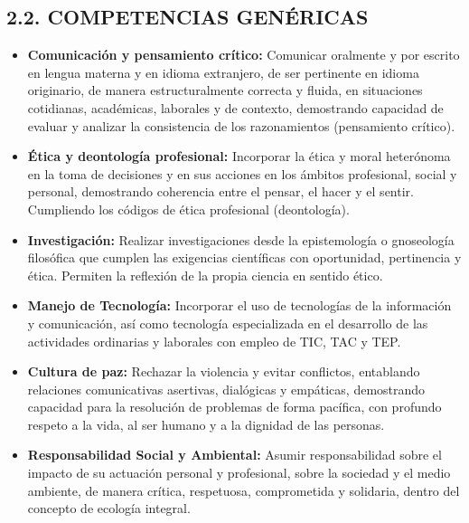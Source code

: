 \documentclass[11pt, letterpaper]{article}
\begin{document}
\subsection*{2.2. COMPETENCIAS GENÉRICAS}
\begin{itemize}[leftmargin=*]
    \item \textbf{Comunicación y pensamiento crítico:} Comunicar oralmente y por escrito en lengua materna y en idioma extranjero, de ser pertinente en idioma originario, de manera estructuralmente correcta y fluida, en situaciones cotidianas, académicas, laborales y de contexto, demostrando capacidad de evaluar y analizar la consistencia de los razonamientos (pensamiento crítico).
    
    \item \textbf{Ética y deontología profesional:} Incorporar la ética y moral heterónoma en la toma de decisiones y en sus acciones en los ámbitos profesional, social y personal, demostrando coherencia entre el pensar, el hacer y el sentir. Cumpliendo los códigos de ética profesional (deontología).
    
    \item \textbf{Investigación:} Realizar investigaciones desde la epistemología o gnoseología filosófica que cumplen las exigencias científicas con oportunidad, pertinencia y ética. Permiten la reflexión de la propia ciencia en sentido ético.
    
    \item \textbf{Manejo de Tecnología:} Incorporar el uso de tecnologías de la información y comunicación, así como tecnología especializada en el desarrollo de las actividades ordinarias y laborales con empleo de TIC, TAC y TEP.
    
    \item \textbf{Cultura de paz:} Rechazar la violencia y evitar conflictos, entablando relaciones comunicativas asertivas, dialógicas y empáticas, demostrando capacidad para la resolución de problemas de forma pacífica, con profundo respeto a la vida, al ser humano y a la dignidad de las personas.
    
    \item \textbf{Responsabilidad Social y Ambiental:} Asumir responsabilidad sobre el impacto de su actuación personal y profesional, sobre la sociedad y el medio ambiente, de manera crítica, respetuosa, comprometida y solidaria, dentro del concepto de ecología integral.
\end{itemize}
\end{document}
